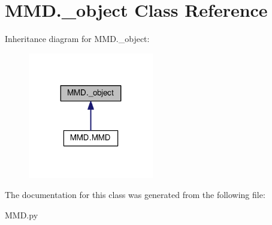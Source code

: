 \hypertarget{classMMD_1_1__object}{}\section{M\+M\+D.\+\_\+object Class Reference}
\label{classMMD_1_1__object}


Inheritance diagram for M\+M\+D.\+\_\+object\+:\nopagebreak
\begin{figure}[H]
\begin{center}
\leavevmode
\includegraphics[width=155pt]{classMMD_1_1__object__inherit__graph}
\end{center}
\end{figure}


The documentation for this class was generated from the following file\+:\begin{DoxyCompactItemize}
\item 
M\+M\+D.\+py\end{DoxyCompactItemize}
